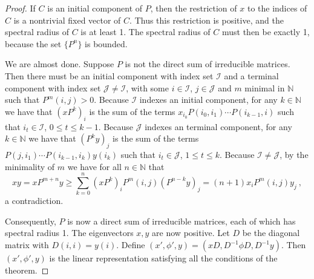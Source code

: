 \documentclass{kepart2010}
\theoremstyle{plain}
\theoremstyle{definition}
\theoremstyle{remark}
\theoremstyle{definition}
\numberwithin{equation}{section}
\begin{document}
\begin{proof}
{}{ If $C$ is an initial component of $P$, then the restriction of
$x$ to the indices of $C$ is a nontrivial fixed vector of $C$. Thus
this restriction is positive, and the
 spectral radius of $C$ is at least 1. The spectral radius
of $C$ must then be exactly 1, because the set $\{P^n\}$ is bounded. }

{}{ We are almost done. Suppose $P$ is not the direct sum of
irreducible matrices. Then there must be an initial component with
index set $\mathcal I$ and a terminal component with index set
$\mathcal J \neq \mathcal I$, with some $i\in \mathcal I$, $j\in
\mathcal J$ and $m$ minimal in $\mathbb N$ such that $P^m(i,j)>0$.
Because $\mathcal I$ indexes an initial component, for any $k\in
\mathbb N$ we have that $(xP^k)_i$ is the sum of the terms
$x_{i_0}P(i_0,i_1)\cdots P(i_{k-1},i)$ such that $i_t \in \mathcal
I$, $0\leq t \leq k-1$. Because $\mathcal J$ indexes an terminal
component, for any $k\in \mathbb N$ we have that $(P^ky)_j$ is the
sum of the terms $P(j,i_1)\cdots P(i_{k-1},i_k)y(i_k)$ such that
$i_t \in \mathcal J$, $1 \leq t \leq k$. Because $\mathcal I \neq
\mathcal J$, by the minimality of $m$ we have for all $n \in \mathbb
N$ that } \begin{equation} xy =xP^{m+n}y \geq
\sum_{k=0}^n(xP^k)_iP^m(i,j)(P^{n-k}y)_j =(n+1)x_iP^m(i,j)y_j \ ,
\end{equation} a contradiction.

Consequently, $P$ is now a direct sum of irreducible matrices,
each of which has spectral radius 1. The eigenvectors $x,y$
are now positive. Let $D$ be the diagonal
matrix with $D(i,i)=y(i)$. Define $(x', \phi',y) = (xD,D^{-1}\phi
D,D^{-1}y)$. Then $(x', \phi',y)$ is the linear representation
satisfying all the conditions of the theorem.

\end{proof}
\end{document}
